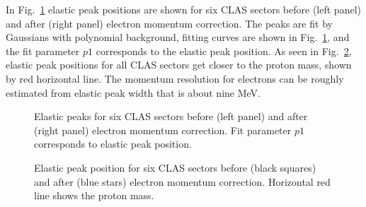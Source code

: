 In Fig.~\ref{fig:el_mom_corr_elast} elastic peak positions are shown for six CLAS sectors before (left panel) and after (right panel) electron momentum correction. The peaks are fit by Gaussians with polynomial background, fitting curves are shown in Fig.~\ref{fig:el_mom_corr_elast}, and the fit parameter $p1$ corresponds to the elastic peak position.  As seen in Fig.~\ref{fig:el_mom_corr_peak_position}, elastic peak positions for all CLAS sectors get closer to the proton mass, shown by red horizontal line. The momentum resolution for electrons can be roughly estimated from  elastic peak width that is about nine MeV.
\begin{figure}[htp]
\begin{center}
\caption{\small Elastic peaks for six CLAS sectors before (left panel) and after (right panel) electron momentum correction. Fit parameter $p1$ corresponds to elastic peak position. \label{fig:el_mom_corr_elast}} 
\end{center}
\end{figure}

\begin{figure}[htp]
\begin{center}
\caption{\small Elastic peak position for six CLAS sectors before (black squares) and after (blue stars) electron momentum correction. Horizontal red line shows the proton mass. \label{fig:el_mom_corr_peak_position}} 
\end{center}
\end{figure}

